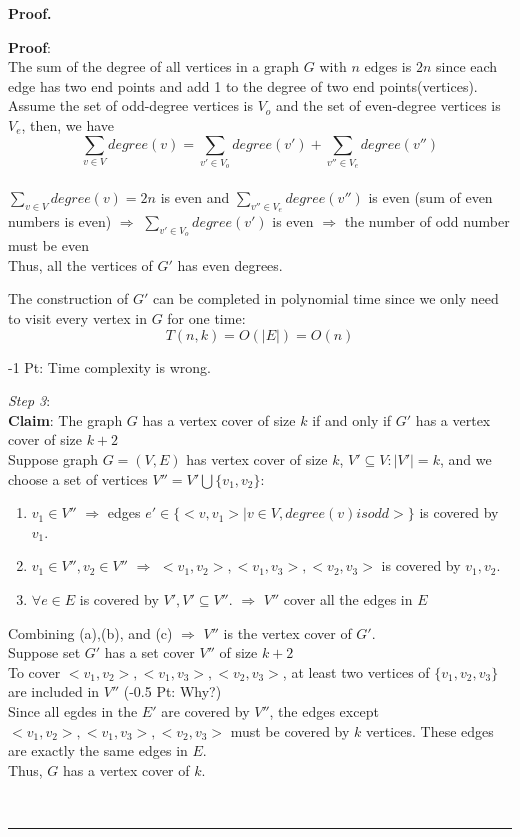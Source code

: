\documentclass{article}%
\newenvironment{proof}[1][Proof]{\textbf{#1.} }{\ \rule{0.5em}{0.5em}}
\newcommand{\add}[1]{\textcolor{dkgreen}{#1}}
\begin{document}
\begin{enumerate}
\begin{proof}
 
  
  \textbf{Proof}:\\ 
  The sum of the degree of all vertices in a graph $G$ with $n$ edges is $2n$ since each edge has two end points and add 1 to the degree of two end points(vertices). Assume the set of odd-degree vertices is $V_{o}$ and the set of even-degree vertices is $V_{e}$, then, we have
  $$\sum_{v\in V}degree(v) = \sum_{v'\in V_{o}}degree(v') +  \sum_{v''\in V_{e}}degree(v'')$$ \\
  $\sum_{v\in V}degree(v)=2n$ is even and $ \sum_{v''\in V_{e}}degree(v'')$ is even (sum of even numbers is even) $\Rightarrow$
  $\sum_{v'\in V_{o}}degree(v')$ is even $\Rightarrow$ the number of odd number must be even\\
  
  Thus, all the vertices of $G'$ has even degrees. 
  
  The construction of $G'$ can be completed in polynomial time since we only need to visit every vertex in $G$ for one time:
  $$T(n,k)=O(|E|)=O(n)$$
  
  \add{-1 Pt: Time complexity is wrong.}
  
  \emph{Step 3}:\\
  \textbf{Claim}: The graph $G$ has a vertex cover of size $k$ if and only if $G'$ has a vertex cover of size $k+2$\\
  Suppose graph $G=(V,E)$ has vertex cover of size $k$, $V' \subseteq V:|V'|=k$, and we choose a set of vertices $V'' = V' \bigcup \{v_{1},v_{2}\}$:
  
\begin{enumerate}
	\item $v_{1} \in V''$ $\Rightarrow$ edges $e' \in \{<v,v_{1}>|v \in V, degree(v) is odd>\}$ is covered by $v_{1}$. 
	\item $v_{1} \in V'',v_{2} \in V''$ $\Rightarrow$ $<v_{1},v_{2}>,<v_{1},v_{3}>,<v_{2},v_{3}>$ is covered by $v_{1},v_{2}$. 
	\item $\forall e \in E$ is covered by $V', V' \subseteq V''.$ $\Rightarrow$ $V''$ cover all the edges in $E$ 
\end{enumerate}
  
  Combining (a),(b), and (c) $\Rightarrow$ $V''$ is the vertex cover of $G'$.\\
 
  Suppose set $G'$ has a set cover $V''$ of size $k+2$\\
  To cover $<v_{1},v_{2}>,<v_{1},v_{3}>,<v_{2},v_{3}>$, at least two vertices of $\{v_{1},v_{2},v_{3}\}$ are included in $V''$ \add{(-0.5 Pt: Why?)}\\
  Since all egdes in the $E'$ are covered by $V''$, the edges except $<v_{1},v_{2}>,<v_{1},v_{3}>,<v_{2},v_{3}>$ must be covered by $k$ vertices. These edges are exactly the same edges in $E$.\\
  Thus, $G$ has a vertex cover of $k$. 
  
  \end{proof}
  
\end{enumerate}
\end{document}

